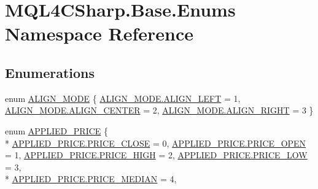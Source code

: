 \hypertarget{namespace_m_q_l4_c_sharp_1_1_base_1_1_enums}{}\section{M\+Q\+L4\+C\+Sharp.\+Base.\+Enums Namespace Reference}
\label{namespace_m_q_l4_c_sharp_1_1_base_1_1_enums}
\subsection*{Enumerations}
\begin{DoxyCompactItemize}
\item 
enum \hyperlink{namespace_m_q_l4_c_sharp_1_1_base_1_1_enums_a39e4f20c4e2a3e92e3571279c771960c}{A\+L\+I\+G\+N\+\_\+\+M\+O\+DE} \{ \hyperlink{namespace_m_q_l4_c_sharp_1_1_base_1_1_enums_a39e4f20c4e2a3e92e3571279c771960ca87496177c8ae88fcc246b2a73b8f7a44}{A\+L\+I\+G\+N\+\_\+\+M\+O\+D\+E.\+A\+L\+I\+G\+N\+\_\+\+L\+E\+FT} = 1, 
\hyperlink{namespace_m_q_l4_c_sharp_1_1_base_1_1_enums_a39e4f20c4e2a3e92e3571279c771960cae74c6b284e30fab310a944208f8eb436}{A\+L\+I\+G\+N\+\_\+\+M\+O\+D\+E.\+A\+L\+I\+G\+N\+\_\+\+C\+E\+N\+T\+ER} = 2, 
\hyperlink{namespace_m_q_l4_c_sharp_1_1_base_1_1_enums_a39e4f20c4e2a3e92e3571279c771960ca982406092c885333f674fa987a566038}{A\+L\+I\+G\+N\+\_\+\+M\+O\+D\+E.\+A\+L\+I\+G\+N\+\_\+\+R\+I\+G\+HT} = 3
 \}
\item 
enum \hyperlink{namespace_m_q_l4_c_sharp_1_1_base_1_1_enums_ab234b380de76951cafea3164c80b3d1b}{A\+P\+P\+L\+I\+E\+D\+\_\+\+P\+R\+I\+CE} \{ \\*
\hyperlink{namespace_m_q_l4_c_sharp_1_1_base_1_1_enums_ab234b380de76951cafea3164c80b3d1ba1128700745ba33bc24a3907e295e85eb}{A\+P\+P\+L\+I\+E\+D\+\_\+\+P\+R\+I\+C\+E.\+P\+R\+I\+C\+E\+\_\+\+C\+L\+O\+SE} = 0, 
\hyperlink{namespace_m_q_l4_c_sharp_1_1_base_1_1_enums_ab234b380de76951cafea3164c80b3d1ba00d03d286cd594e56c2822771e22da29}{A\+P\+P\+L\+I\+E\+D\+\_\+\+P\+R\+I\+C\+E.\+P\+R\+I\+C\+E\+\_\+\+O\+P\+EN} = 1, 
\hyperlink{namespace_m_q_l4_c_sharp_1_1_base_1_1_enums_ab234b380de76951cafea3164c80b3d1babfcf15314b9974b1f8d958365cd65f0e}{A\+P\+P\+L\+I\+E\+D\+\_\+\+P\+R\+I\+C\+E.\+P\+R\+I\+C\+E\+\_\+\+H\+I\+GH} = 2, 
\hyperlink{namespace_m_q_l4_c_sharp_1_1_base_1_1_enums_ab234b380de76951cafea3164c80b3d1ba8fef364f598cf36b6d5c903ff72cd258}{A\+P\+P\+L\+I\+E\+D\+\_\+\+P\+R\+I\+C\+E.\+P\+R\+I\+C\+E\+\_\+\+L\+OW} = 3, 
\\*
\hyperlink{namespace_m_q_l4_c_sharp_1_1_base_1_1_enums_ab234b380de76951cafea3164c80b3d1bab1f4f36f251d0c81dfdedaa21caaab4f}{A\+P\+P\+L\+I\+E\+D\+\_\+\+P\+R\+I\+C\+E.\+P\+R\+I\+C\+E\+\_\+\+M\+E\+D\+I\+AN} = 4, 

\end{DoxyCompactItemize}
